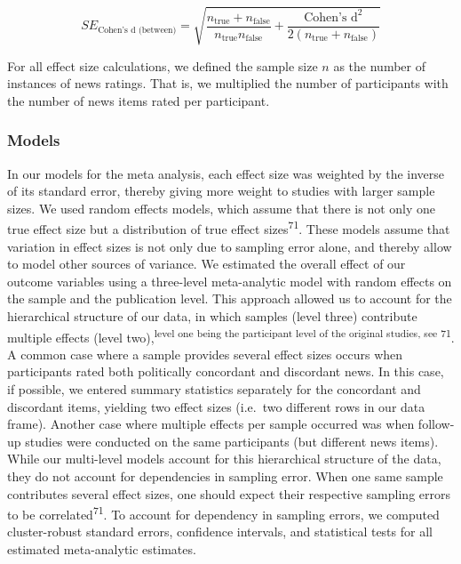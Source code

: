 \documentclass[
  man]{apa6}
\begin{document}
\[
SE_{\text{Cohen's d (between)}} = \sqrt{\frac{n_{\text{true}}+n_{\text{false}}}{n_{\text{true}}n_{\text{false}}}+\frac{\text{Cohen's d}^2}{2(n_{\text{true}}+n_{\text{false}})}}
\]

For all effect size calculations, we defined the sample size \(n\) as the number of instances of news ratings. That is, we multiplied the number of participants with the number of news items rated per participant.

\subsubsection{Models}\label{models}

In our models for the meta analysis, each effect size was weighted by the inverse of its standard error, thereby giving more weight to studies with larger sample sizes. We used random effects models, which assume that there is not only one true effect size but a distribution of true effect sizes\textsuperscript{71}. These models assume that variation in effect sizes is not only due to sampling error alone, and thereby allow to model other sources of variance. We estimated the overall effect of our outcome variables using a three-level meta-analytic model with random effects on the sample and the publication level. This approach allowed us to account for the hierarchical structure of our data, in which samples (level three) contribute multiple effects (level two),\textsuperscript{level one being the participant level of the original studies, see 71}. A common case where a sample provides several effect sizes occurs when participants rated both politically concordant and discordant news. In this case, if possible, we entered summary statistics separately for the concordant and discordant items, yielding two effect sizes (i.e.~two different rows in our data frame). Another case where multiple effects per sample occurred was when follow-up studies were conducted on the same participants (but different news items). While our multi-level models account for this hierarchical structure of the data, they do not account for dependencies in sampling error. When one same sample contributes several effect sizes, one should expect their respective sampling errors to be correlated\textsuperscript{71}. To account for dependency in sampling errors, we computed cluster-robust standard errors, confidence intervals, and statistical tests for all estimated meta-analytic estimates.
\end{document}
